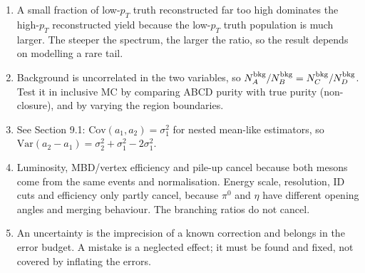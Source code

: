 \documentclass[11pt,letterpaper]{article}
\begin{document}
\begin{enumerate}
unfolding the number of iterations is the regularisation parameter; the prior is the starting point.
\item A small fraction of low-$p_T$ truth reconstructed far too high dominates the high-$p_T$ reconstructed yield because the
low-$p_T$ truth population is much larger. The steeper the spectrum, the larger the ratio, so the result depends on modelling a rare tail.
\item Background is uncorrelated in the two variables, so $N_A^{\rm bkg}/N_B^{\rm bkg}=N_C^{\rm bkg}/N_D^{\rm bkg}$. Test it in
inclusive MC by comparing ABCD purity with true purity (non-closure), and by varying the region boundaries.
\item See Section 9.1: $\mathrm{Cov}(a_1,a_2)=\sigma_1^2$ for nested mean-like estimators, so
$\mathrm{Var}(a_2-a_1)=\sigma_2^2+\sigma_1^2-2\sigma_1^2$.
\item Luminosity, MBD/vertex efficiency and pile-up cancel because both mesons come from the same events and normalisation. Energy scale,
resolution, ID cuts and efficiency only partly cancel, because $\pi^0$ and $\eta$ have different opening angles and merging behaviour.
The branching ratios do not cancel.
\item An uncertainty is the imprecision of a known correction and belongs in the error budget. A mistake is a neglected effect; it must
be found and fixed, not covered by inflating the errors.
\end{enumerate}
\end{document}
